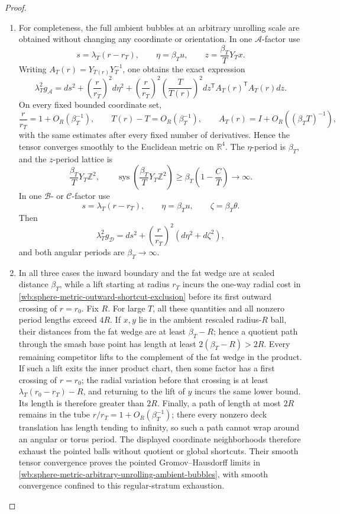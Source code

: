 \begin{proof}
\begin{enumerate}[label=\arabic*.,leftmargin=*]
\item For completeness, the full ambient bubbles at an arbitrary unrolling scale
are obtained without changing any coordinate or orientation.  In one
\(\mathcal A\)-factor use
\[
 s=\lambda_T(r-r_T),\qquad
 \eta=\beta_Tu,\qquad
 z=\frac{\beta_T}{T}Y_Tx.
\]
Writing \(A_T(r)=Y_{T(r)}Y_T^{-1}\), one obtains the exact expression
\[
 \lambda_T^2g_{\mathcal A}
 =ds^2+\left(\frac r{r_T}\right)^2d\eta^2
  +\left(\frac r{r_T}\right)^2
   \left(\frac{T}{T(r)}\right)^2
   dz^{\mathsf T}A_T(r)^{\mathsf T}A_T(r)dz.
\]
On every fixed bounded coordinate set,
\[
 \frac r{r_T}=1+O_R(\beta_T^{-1}),\qquad
 T(r)-T=O_R(\beta_T^{-1}),\qquad
 A_T(r)=I+O_R((\beta_TT)^{-1}),
\]
with the same estimates after every fixed number of derivatives.  Hence
the tensor converges smoothly to the Euclidean metric on \(\mathbb R^4\).
The \(\eta\)-period is \(\beta_T\), and the \(z\)-period lattice is
\[
 \frac{\beta_T}{T}Y_T\mathbb Z^2,
 \qquad
 \operatorname{sys}\left(
   \frac{\beta_T}{T}Y_T\mathbb Z^2\right)
 \geq\beta_T\left(1-\frac CT\right)\longrightarrow\infty.
\]
In one \(\mathcal B\)- or \(\mathcal C\)-factor use
\[
 s=\lambda_T(r-r_T),\qquad
 \eta=\beta_Tu,\qquad \zeta=\beta_T\theta.
\]
Then
\[
 \lambda_T^2g_{\mathcal D}
 =ds^2+\left(\frac r{r_T}\right)^2
       (d\eta^2+d\zeta^2),
\]
and both angular periods are \(\beta_T\to\infty\).

\item In all three cases the inward boundary and the fat wedge are at scaled
distance \(\beta_T\), while a lift starting at radius \(r_T\) incurs the
one-way radial cost in
\eqref{wb:sphere-metric-outward-shortcut-exclusion} before its first outward
crossing of \(r=r_0\).  Fix \(R\).  For large \(T\), all these quantities
and all nonzero period lengths exceed \(4R\).
If \(x,y\) lie in the ambient rescaled radius-\(R\) ball, their distances
from the fat wedge are at least \(\beta_T-R\); hence a quotient path through
the smash base point has length at least \(2(\beta_T-R)>2R\).  Every
remaining competitor lifts to the complement of the fat wedge in the
product.  If such a lift exits the inner product chart, then some factor
has a first crossing of \(r=r_0\); the radial variation before that crossing
is at least \(\lambda_T(r_0-r_T)-R\), and returning to the lift of \(y\)
incurs the same lower bound.  Its length is therefore greater than \(2R\).
Finally, a path of length at most \(2R\) remains in the tube
\(r/r_T=1+O_R(\beta_T^{-1})\); there every nonzero deck translation has
length tending to infinity, so such a path cannot wrap around an angular
or torus period.  The displayed coordinate neighborhoods therefore exhaust
the pointed balls without quotient or global shortcuts.
Their smooth tensor convergence proves the pointed Gromov--Hausdorff
limits in
\eqref{wb:sphere-metric-arbitrary-unrolling-ambient-bubbles}, with smooth
convergence confined to this regular-stratum exhaustion.
\end{enumerate}
\end{proof}

